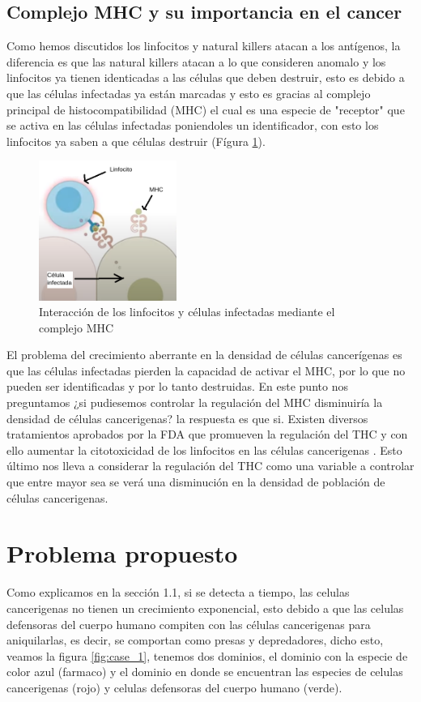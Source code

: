 \documentclass{article}
\begin{document}
\subsection{Complejo MHC y su importancia en el cancer}
Como hemos discutidos los linfocitos y natural killers atacan a los antígenos, la diferencia es que las natural killers atacan a lo que consideren anomalo y los  linfocitos ya tienen identicadas a las células que deben destruir, esto es debido a que las células infectadas ya están marcadas y esto es gracias al complejo principal de histocompatibilidad (MHC) el cual es una especie de "receptor" que se activa en las células infectadas poniendoles un identificador, con esto los linfocitos ya saben a que células destruir (Fígura \ref{fig:mhc}).

\begin{figure}[ht]
    \centering
    \includegraphics[width=0.4\textwidth]{images/mhc.png}
    \caption{Interacción de los linfocitos y células infectadas mediante el complejo MHC}
    \label{fig:mhc}
\end{figure}

El problema del crecimiento aberrante en la densidad de células cancerígenas es que las células infectadas pierden la capacidad de activar el MHC, por lo que no pueden ser identificadas y por lo tanto destruidas. En este punto nos preguntamos ¿si pudiesemos controlar la regulación del MHC disminuiría la densidad de células cancerigenas? la respuesta es que si. Existen diversos tratamientos aprobados por la FDA que promueven la regulación del THC y con ello aumentar la citotoxicidad de los linfocitos en las células cancerigenas \cite{Cornel072020}. Esto último nos lleva a considerar la regulación del THC como una variable a controlar que entre mayor sea se verá una disminución en la densidad de población de células cancerigenas.


 \newpage
\section{Problema propuesto}
Como explicamos en la sección 1.1, si se detecta a tiempo, las celulas cancerigenas no tienen un crecimiento exponencial, esto debido a que las celulas defensoras del cuerpo humano compiten con las células cancerigenas para aniquilarlas, es decir, se comportan como presas y depredadores, dicho esto, veamos la figura \ref{fig:case_1}, tenemos dos dominios, el dominio con la especie de color azul (farmaco) y el dominio en donde se encuentran las especies de celulas cancerigenas (rojo) y celulas defensoras del cuerpo humano (verde).
\end{document}
